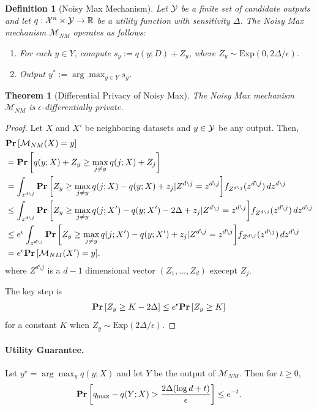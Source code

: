 \documentclass[11pt, a4paper]{article}
\newtheorem{definition}{Definition}
\newtheorem{theorem}{Theorem}
\begin{document}
\begin{definition}[Noisy Max Mechanism]
Let ${\cal Y}$ be a finite set of candidate outputs and let $q: {\cal X}^n\times {\cal Y} \to \mathbb{R}$ be a utility function 
with sensitivity $\Delta$.
The Noisy Max mechanism $\mathcal{M}_{NM}$ operates as follows:
\begin{enumerate}
    \item For each $y \in Y$, compute $s_y := q(y;D) + Z_y$, where $Z_y \sim \mathrm{Exp}(0, 2\Delta/\epsilon)$.
    \item Output $y^* := \arg\max_{y \in Y} s_y$.
\end{enumerate}
\end{definition}

\begin{theorem}[Differential Privacy of Noisy Max]
The Noisy Max mechanism $\mathcal{M}_{NM}$ is $\epsilon$-differentially private.
\end{theorem}

\begin{proof}
Let $X$ and $X'$ be neighboring datasets and $y \in {\cal Y}$ be any output.
Then,
\begin{align}
& \Prob{\mathcal{M}_{NM}(X) = y}\\
&= \Prob{q(y;X) +Z_y\geq \max_{j\neq y} q(j;X)+Z_j}\\
&= \int_{z^{d\setminus j}} \Prob{Z_y\geq \max_{j\neq y} q(j;X)-q(y;X)+z_j | Z^{d\setminus j}=z^{d\setminus j}}
f_{Z^{d\setminus j}}(z^{d\setminus j})\,dz^{d\setminus j}\\
&\leq \int_{z^{d\setminus j}} \Prob{Z_y\geq \max_{j\neq y} q(j;X')-q(y;X')-2\Delta +z_j | Z^{d\setminus j}=z^{d\setminus j}}
f_{Z^{d\setminus j}}(z^{d\setminus j})\,dz^{d\setminus j}\\
&\leq e^\epsilon \int_{z^{d\setminus j}} \Prob{Z_y\geq \max_{j\neq y} q(j;X')-q(y;X') +z_j | Z^{d\setminus j}=z^{d\setminus j}}
f_{Z^{d\setminus j}}(z^{d\setminus j})\,dz^{d\setminus j}\\
&= e^\epsilon\Prob{\mathcal{M}_{NM}(X') = y}.
\end{align}
where $Z^{d\setminus j}$ is a $d-1$ dimensional vector $(Z_1, \dots, Z_d)$ execept $Z_j$.

The key step is
\begin{align}
    \Prob{Z_y \geq K -2\Delta} \leq e^\epsilon\Prob{Z_y\geq K}
\end{align}
for a constant $K$ when $Z_y\sim\mbox{Exp}(2\Delta/\epsilon)$.
\end{proof}

\paragraph{Utility Guarantee.}
Let $y^\star = \arg\max_y q(y; X)$ and let $Y$ be the output of $\mathcal{M}_{NM}$. Then for $t \ge 0$,
\[
\Prob{q_{\max} - q(Y;X) > \frac{2\Delta(\log d + t)}{\epsilon}} \le e^{-t}.
\]
\end{document}
